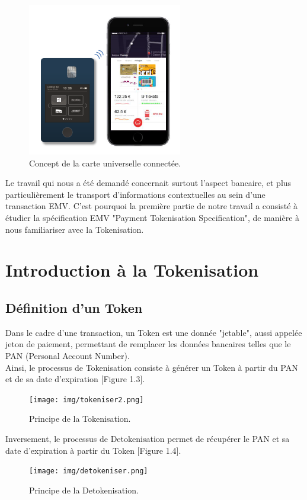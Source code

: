 \documentclass{report}
\begin{document}
\begin{figure}[!h]
    \centering
			\includegraphics[scale=0.5]{img/carte.png}
			\caption{\label{Carte} Concept de la carte universelle connectée.}			
\end{figure}

Le travail qui nous a été demandé concernait surtout l'aspect bancaire, et plus particulièrement le transport d'informations contextuelles au sein d'une transaction EMV. C'est pourquoi la première partie de notre travail a consisté à étudier la spécification EMV "Payment Tokenisation Specification", de manière à nous familiariser avec la Tokenisation.


\section{Introduction à la Tokenisation}
\subsection{Définition d'un Token}
Dans le cadre d'une transaction, un Token est une donnée "jetable", aussi appelée jeton de paiement, permettant de remplacer les données bancaires telles que le PAN (Personal Account Number).\\
Ainsi, le processus de Tokenisation consiste à générer un Token à partir du PAN et de sa date d'expiration [Figure 1.3].

\begin{figure}[!h]
    \centering
			\texttt{[image: img/tokeniser2.png]}
			\caption{\label{Tokenisation} Principe de la Tokenisation.}			
\end{figure}

Inversement, le processus de Detokenisation permet de récupérer le PAN et sa date d'expiration à partir du Token [Figure 1.4]. 

\begin{figure}[!h]
    \centering
			\texttt{[image: img/detokeniser.png]}
			\caption{\label{Detokenisation} Principe de la Detokenisation.}			
\end{figure}
\end{document}
